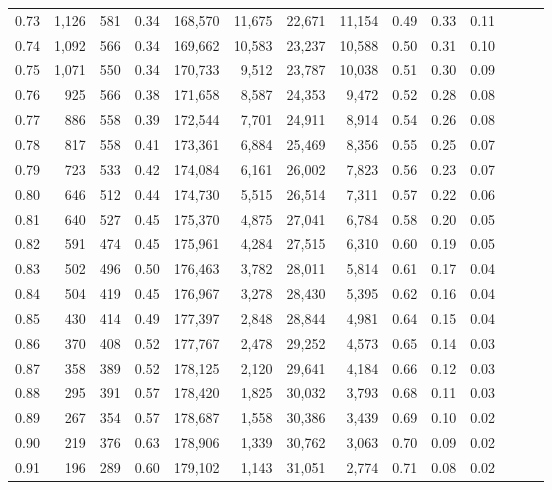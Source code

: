 \begin{tabular}{rrrrrrrrrrrrrr}
0.73 &  1,126 &  581 &  0.34 &  168,570 &   11,675 &  22,671 &  11,154 &  0.49 &  0.33 &      0.11 \\
0.74 &  1,092 &  566 &  0.34 &  169,662 &   10,583 &  23,237 &  10,588 &  0.50 &  0.31 &      0.10 \\
0.75 &  1,071 &  550 &  0.34 &  170,733 &    9,512 &  23,787 &  10,038 &  0.51 &  0.30 &      0.09 \\
0.76 &    925 &  566 &  0.38 &  171,658 &    8,587 &  24,353 &   9,472 &  0.52 &  0.28 &      0.08 \\
0.77 &    886 &  558 &  0.39 &  172,544 &    7,701 &  24,911 &   8,914 &  0.54 &  0.26 &      0.08 \\
0.78 &    817 &  558 &  0.41 &  173,361 &    6,884 &  25,469 &   8,356 &  0.55 &  0.25 &      0.07 \\
0.79 &    723 &  533 &  0.42 &  174,084 &    6,161 &  26,002 &   7,823 &  0.56 &  0.23 &      0.07 \\
0.80 &    646 &  512 &  0.44 &  174,730 &    5,515 &  26,514 &   7,311 &  0.57 &  0.22 &      0.06 \\
0.81 &    640 &  527 &  0.45 &  175,370 &    4,875 &  27,041 &   6,784 &  0.58 &  0.20 &      0.05 \\
0.82 &    591 &  474 &  0.45 &  175,961 &    4,284 &  27,515 &   6,310 &  0.60 &  0.19 &      0.05 \\
0.83 &    502 &  496 &  0.50 &  176,463 &    3,782 &  28,011 &   5,814 &  0.61 &  0.17 &      0.04 \\
0.84 &    504 &  419 &  0.45 &  176,967 &    3,278 &  28,430 &   5,395 &  0.62 &  0.16 &      0.04 \\
0.85 &    430 &  414 &  0.49 &  177,397 &    2,848 &  28,844 &   4,981 &  0.64 &  0.15 &      0.04 \\
0.86 &    370 &  408 &  0.52 &  177,767 &    2,478 &  29,252 &   4,573 &  0.65 &  0.14 &      0.03 \\
0.87 &    358 &  389 &  0.52 &  178,125 &    2,120 &  29,641 &   4,184 &  0.66 &  0.12 &      0.03 \\
0.88 &    295 &  391 &  0.57 &  178,420 &    1,825 &  30,032 &   3,793 &  0.68 &  0.11 &      0.03 \\
0.89 &    267 &  354 &  0.57 &  178,687 &    1,558 &  30,386 &   3,439 &  0.69 &  0.10 &      0.02 \\
0.90 &    219 &  376 &  0.63 &  178,906 &    1,339 &  30,762 &   3,063 &  0.70 &  0.09 &      0.02 \\
0.91 &    196 &  289 &  0.60 &  179,102 &    1,143 &  31,051 &   2,774 &  0.71 &  0.08 &      0.02 \\

\end{tabular}

